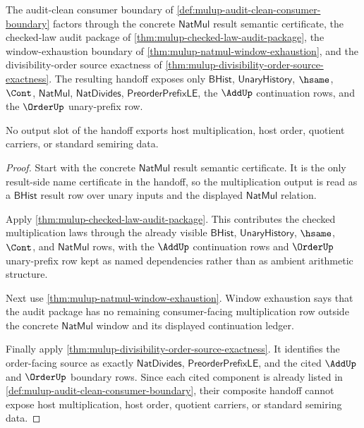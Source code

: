\begin{theorem}
\label{thm:mulup-audit-clean-result-namecert-handoff}
The audit-clean consumer boundary of
\autoref{def:mulup-audit-clean-consumer-boundary} factors through the concrete
$\mathsf{NatMul}$ result semantic certificate, the checked-law audit package of
\autoref{thm:mulup-checked-law-audit-package}, the window-exhaustion boundary
of \autoref{thm:mulup-natmul-window-exhaustion}, and the
divisibility-order source exactness of
\autoref{thm:mulup-divisibility-order-source-exactness}. The resulting handoff
exposes only $\mathsf{BHist}$, $\mathsf{UnaryHistory}$, $\hsame$, $\Cont$,
$\mathsf{NatMul}$, $\mathsf{NatDivides}$, $\mathsf{PreorderPrefixLE}$, the
$\AddUp$ continuation rows, and the $\OrderUp$ unary-prefix row.

No output slot of the handoff exports host multiplication, host order,
quotient carriers, or standard semiring data.
\end{theorem}
\begin{proof}
Start with the concrete $\mathsf{NatMul}$ result semantic certificate. It is the
only result-side name certificate in the handoff, so the multiplication output
is read as a $\mathsf{BHist}$ result row over unary inputs and the displayed
$\mathsf{NatMul}$ relation.

Apply \autoref{thm:mulup-checked-law-audit-package}. This contributes the
checked multiplication laws through the already visible $\mathsf{BHist}$,
$\mathsf{UnaryHistory}$, $\hsame$, $\Cont$, and $\mathsf{NatMul}$ rows, with
the $\AddUp$ continuation rows and $\OrderUp$ unary-prefix row kept as named
dependencies rather than as ambient arithmetic structure.

Next use \autoref{thm:mulup-natmul-window-exhaustion}. Window exhaustion says
that the audit package has no remaining consumer-facing multiplication row
outside the concrete $\mathsf{NatMul}$ window and its displayed continuation
ledger.

Finally apply \autoref{thm:mulup-divisibility-order-source-exactness}. It
identifies the order-facing source as exactly $\mathsf{NatDivides}$,
$\mathsf{PreorderPrefixLE}$, and the cited $\AddUp$ and $\OrderUp$ boundary
rows. Since each cited component is already listed in
\autoref{def:mulup-audit-clean-consumer-boundary}, their composite handoff
cannot expose host multiplication, host order, quotient carriers, or standard
semiring data.
\end{proof}

